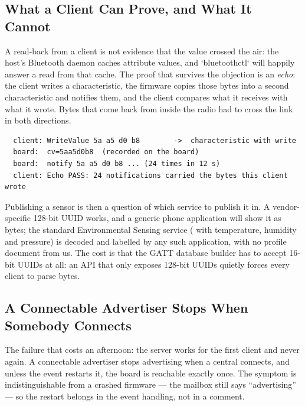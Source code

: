 \subsection{What a Client Can Prove, and What It Cannot}

A read-back from a client is not evidence that the value crossed the air: the host's Bluetooth daemon
caches attribute values, and `bluetoothctl` will happily answer a read from that cache. The proof that
survives the objection is an \emph{echo}: the client writes a characteristic, the firmware copies those
bytes into a second characteristic and notifies them, and the client compares what it receives with
what it wrote. Bytes that come back from inside the radio had to cross the link in both directions.

\begin{verbatim}
  client: WriteValue 5a a5 d0 b8        ->  characteristic with write
  board:  cv=5aa5d0b8  (recorded on the board)
  board:  notify 5a a5 d0 b8 ... (24 times in 12 s)
  client: Echo PASS: 24 notifications carried the bytes this client wrote
\end{verbatim}

Publishing a sensor is then a question of which service to publish it in. A vendor-specific 128-bit
UUID works, and a generic phone application will show it as bytes; the standard Environmental Sensing
service ( with  temperature,  humidity and
 pressure) is decoded and labelled by any such application, with no profile
document from us. The cost is that the GATT database builder has to accept 16-bit UUIDs at all: an API
that only exposes 128-bit UUIDs quietly forces every client to parse bytes.

\subsection{A Connectable Advertiser Stops When Somebody Connects}

The failure that costs an afternoon: the server works for the first client and never again. A
connectable advertiser stops advertising when a central connects, and unless the
 event restarts it, the board is reachable exactly once. The symptom is
indistinguishable from a crashed firmware --- the mailbox still says ``advertising'' --- so the
restart belongs in the event handling, not in a comment.

